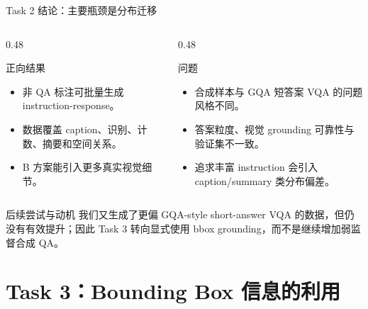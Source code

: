 \documentclass{beamer}
\begin{document}
\begin{frame}{Task 2 结论：主要瓶颈是分布迁移}
\small
\begin{columns}[T,onlytextwidth]
\begin{column}{0.48\textwidth}
\begin{block}{正向结果}
\begin{itemize}
\item 非 QA 标注可批量生成 instruction-response。
\item 数据覆盖 caption、识别、计数、摘要和空间关系。
\item B 方案能引入更多真实视觉细节。
\end{itemize}
\end{block}
\end{column}
\begin{column}{0.48\textwidth}
\begin{block}{问题}
\begin{itemize}
\item 合成样本与 GQA 短答案 VQA 的问题风格不同。
\item 答案粒度、视觉 grounding 可靠性与验证集不一致。
\item 追求丰富 instruction 会引入 caption/summary 类分布偏差。
\end{itemize}
\end{block}
\end{column}
\end{columns}
\vspace{0.4em}
\begin{block}{后续尝试与动机}
我们又生成了更偏 GQA-style short-answer VQA 的数据，但仍没有有效提升；因此 Task 3 转向显式使用 bbox grounding，而不是继续增加弱监督合成 QA。
\end{block}
\end{frame}

\section{Task 3：Bounding Box 信息的利用}
\end{document}
